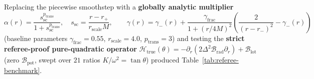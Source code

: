 \documentclass[11pt, a4paper]{article}
\theoremstyle{remark}
\begin{document}
Replacing the piecewise smoothstep with a \textbf{globally analytic multiplier}
\begin{equation}
\label{eq:analytic-mult}
\alpha(r) = \frac{s_{\mathrm{sc}}^{p_{\mathrm{trans}}}}{1 + s_{\mathrm{sc}}^{p_{\mathrm{trans}}}}, \quad s_{\mathrm{sc}} = \frac{r - r_+}{r_{\mathrm{scale}} M}, \qquad \gamma(r) = \gamma_-(r) + \frac{\gamma_{\mathrm{frac}}}{1 + (r/4M)^2}\!\left(\frac{2}{(r - r_-)^2} - \gamma_-(r)\right)
\end{equation}
(baseline parameters $\gamma_{\mathrm{frac}} = 0.55$, $r_{\mathrm{scale}} = 4.0$, $p_{\mathrm{trans}} = 3$) and testing the \textbf{strict referee-proof pure-quadratic operator} $\mathcal{H}_{\mathrm{true}}(\theta) = -\partial_r(2\Delta^2\mathcal{B}_{\mathrm{rad}}\partial_r) + \mathcal{B}_{\mathrm{lot}}$ (zero $\mathcal{B}_{\mathrm{pot}}$, swept over $21$ ratios $K/\omega^2 = \tan\theta$) produced Table~\ref{tab:referee-benchmark}.
\end{document}
